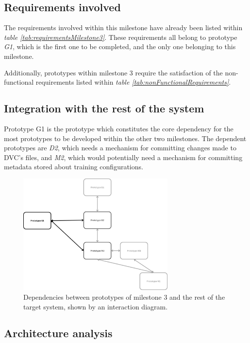 \subsection{Requirements involved}

The requirements involved within this milestone have already been listed within \emph{table \ref{tab:requirementsMilestone3}}. These requirements all belong to prototype \emph{G1}, which
is the first one to be completed, and the only one belonging to this milestone.

Additionally, prototypes within milestone 3 require the satisfaction of the non-functional requirements listed within \emph{table \ref{tab:nonFunctionalRequirements}}.

\subsection{Integration with the rest of the system}

Prototype G1 is the prototype which constitutes the core dependency for the most prototypes to be developed within the other two milestones. The dependent prototypes are \emph{D2}, which
needs a mechanism for committing changes made to DVC's files, and \emph{M2}, which would potentially need a mechanism for committing metadata stored about training configurations.

\begin{figure}[H]
    \centering
    \includegraphics[width=0.7\textwidth]{figs/G-dependencies.png}
    \caption{Dependencies between prototypes of milestone 3 and the rest of the target system, shown by an interaction diagram.}
\end{figure}

\subsection{Architecture analysis}


